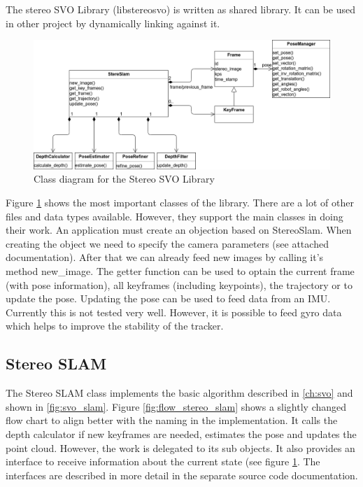 \documentclass[11pt,a4paper,titlepage,oneside]{report}
\begin{document}
The stereo SVO Library (libstereosvo) is written as shared library. It can be used in other project by dynamically linking against it.

\begin{figure}[H]
  \centering
  \includegraphics[width=1.0\textwidth]{img/class_diagram.png}
  \caption{Class diagram for the Stereo SVO Library}\label{fig:class_diagram}
\end{figure}

Figure \ref{fig:class_diagram} shows the most important classes of the library. There are a lot of other files and data types available. However, they support the main classes in doing their work. An application must create an objection based on StereoSlam. When creating the object we need to specify the camera parameters (see attached documentation). After that we can already feed new images by calling it's method new\_image. The getter function can be used to optain the current frame (with pose information), all keyframes (including keypoints), the trajectory or to update the pose. Updating the pose can be used to feed data from an IMU. Currently this is not tested very well. However, it is possible to feed gyro data which helps to improve the stability of the tracker.

\subsection{Stereo SLAM}

The Stereo SLAM class implements the basic algorithm described in \ref{ch:svo} and shown in \ref{fig:svo_slam}. Figure \ref{fig:flow_stereo_slam} shows a slightly changed flow chart to align better with the naming in the implementation. It calls the depth calculator if new keyframes are needed, estimates the pose and updates the point cloud. However, the work is delegated to its sub objects. It also provides an interface to receive information about the current state (see figure \ref{fig:class_diagram}. The interfaces are described in more detail in the separate source code documentation.
\end{document}
